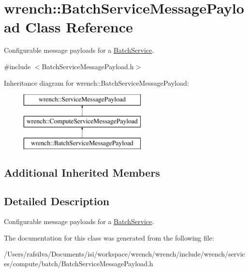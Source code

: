 \hypertarget{classwrench_1_1_batch_service_message_payload}{}\section{wrench\+:\+:Batch\+Service\+Message\+Payload Class Reference}
\label{classwrench_1_1_batch_service_message_payload}


Configurable message payloads for a \hyperlink{classwrench_1_1_batch_service}{Batch\+Service}.  




{\ttfamily \#include $<$Batch\+Service\+Message\+Payload.\+h$>$}

Inheritance diagram for wrench\+:\+:Batch\+Service\+Message\+Payload\+:\begin{figure}[H]
\begin{center}
\leavevmode
\includegraphics[height=3.000000cm]{classwrench_1_1_batch_service_message_payload}
\end{center}
\end{figure}
\subsection*{Additional Inherited Members}


\subsection{Detailed Description}
Configurable message payloads for a \hyperlink{classwrench_1_1_batch_service}{Batch\+Service}. 

The documentation for this class was generated from the following file\+:\begin{DoxyCompactItemize}
\item 
/\+Users/rafsilva/\+Documents/isi/workspace/wrench/wrench/include/wrench/services/compute/batch/Batch\+Service\+Message\+Payload.\+h\end{DoxyCompactItemize}
